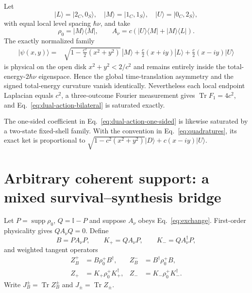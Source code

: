 \documentclass[aps,pra,preprint,nofootinbib]{revtex4-2}
\newcommand{\Tr}{\operatorname{Tr}}
\newcommand{\supp}{\operatorname{supp}}
\newcommand{\id}{\mathbb I}
\newcommand{\rhozero}{\rho_0}
\begin{document}
Let
\begin{equation}
|L\rangle=|2_C,0_S\rangle,\quad
|M\rangle=|1_C,1_S\rangle,\quad
|U\rangle=|0_C,2_S\rangle,
\end{equation}
with equal local level spacing $\hbar\nu$, and take
\begin{equation}
\rhozero=|M\rangle\!\langle M|,
\qquad
A_\nu=c(|U\rangle\!\langle M|+|M\rangle\!\langle L|).
\end{equation}
The exactly normalized family
\begin{align}
|\psi(x,y)\rangle={}&
\sqrt{1-\frac{c^2}{2}(x^2+y^2)}\,|M\rangle
+\frac c2(x+i y)|L\rangle
+\frac c2(x-i y)|U\rangle
\label{eq:bilateral-extremizer}
\end{align}
is physical on the open disk $x^2+y^2<2/c^2$ and remains entirely inside the total-energy-$2\hbar\nu$ eigenspace.  Hence the global time-translation asymmetry and the signed total-energy curvature vanish identically.  Nevertheless each local endpoint Laplacian equals $c^2$, a three-outcome Fourier measurement gives $\Tr F_1=4c^2$, and Eq.~\eqref{eq:dual-action-bilateral} is saturated exactly.

The one-sided coefficient in Eq.~\eqref{eq:dual-action-one-sided} is likewise saturated by a two-state fixed-shell family.  With the convention in Eq.~\eqref{eq:quadratures}, its exact ket is proportional to $\sqrt{1-c^2(x^2+y^2)}|D\rangle+c(x-i y)|U\rangle$.

\section{Arbitrary coherent support: a mixed survival--synthesis bridge}
\label{sec:mixed}


Let $P=\supp\rhozero$, $Q=\id-P$ and suppose $A_\nu$ obeys Eq.~\eqref{eq:exchange}.  First-order physicality gives $QA_\nu Q=0$.  Define
\begin{equation}
B=PA_\nu P,\qquad
K_+=QA_\nu P,\qquad
K_-=QA_\nu^\dagger P,
\label{eq:mixed-decomp}
\end{equation}
and weighted tangent operators
\begin{align}
Z_B^+&=B\rhozero^+B^\dagger,&
Z_B^-&=B^\dagger\rhozero^+B,\\
Z_+&=K_+\rhozero^+K_+^\dagger,&
Z_-&=K_-\rhozero^+K_-^\dagger.
\end{align}
Write $J_B^\pm=\Tr Z_B^\pm$ and $J_\pm=\Tr Z_\pm$.
\end{document}
